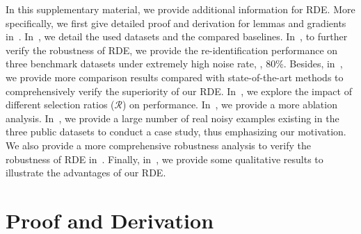 \documentclass[10pt,twocolumn,letterpaper]{article}
\begin{document}
In this supplementary material, we provide additional information for RDE. More specifically, we first give detailed proof and derivation for lemmas and gradients in~. In~, we detail the used datasets and the compared baselines. In~, to further verify the robustness of RDE, we provide the re-identification performance on three benchmark datasets under extremely high noise rate, \ie, 80\%. Besides, in~, we provide more comparison results compared with state-of-the-art methods to comprehensively verify the superiority of our RDE. In~, we explore the impact of different selection ratios ($\mathcal{R}$) on performance. In~, we provide a more ablation analysis. In~, we provide a large number of real noisy examples existing in the three public datasets to conduct a case study, thus emphasizing our motivation. We also provide a more comprehensive robustness analysis to verify the robustness of RDE in~. Finally, in~, we provide some qualitative results to illustrate the advantages of our RDE.


\section{Proof and Derivation\label{app1}}
\end{document}
